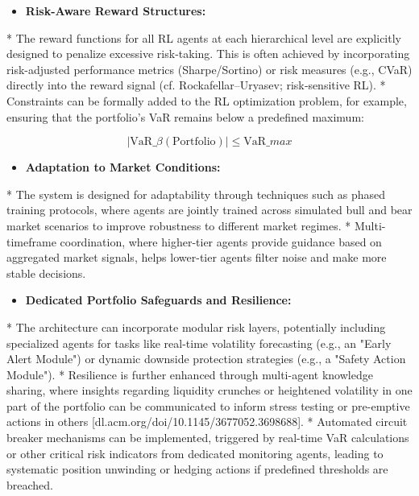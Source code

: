 \documentclass[11pt,a4paper]{article}
\begin{document}
\begin{itemize}
\item   \textbf{Risk-Aware Reward Structures:}
\end{itemize}
    *   The reward functions for all RL agents at each hierarchical level are explicitly designed to penalize excessive risk-taking. This is often achieved by incorporating risk-adjusted performance metrics (Sharpe/Sortino) or risk measures (e.g., CVaR) directly into the reward signal (cf. Rockafellar–Uryasev; risk‑sensitive RL).
    *   Constraints can be formally added to the RL optimization problem, for example, ensuring that the portfolio's VaR remains below a predefined maximum:
    
\begin{equation}
|\text{VaR}\_\beta(\text{Portfolio})| \leq \text{VaR}\_{max}
\end{equation}

\begin{itemize}
\item   \textbf{Adaptation to Market Conditions:}
\end{itemize}
    *   The system is designed for adaptability through techniques such as phased training protocols, where agents are jointly trained across simulated bull and bear market scenarios to improve robustness to different market regimes.
    *   Multi-timeframe coordination, where higher-tier agents provide guidance based on aggregated market signals, helps lower-tier agents filter noise and make more stable decisions.

\begin{itemize}
\item   \textbf{Dedicated Portfolio Safeguards and Resilience:}
\end{itemize}
    *   The architecture can incorporate modular risk layers, potentially including specialized agents for tasks like real-time volatility forecasting (e.g., an "Early Alert Module") or dynamic downside protection strategies (e.g., a "Safety Action Module").
    *   Resilience is further enhanced through multi-agent knowledge sharing, where insights regarding liquidity crunches or heightened volatility in one part of the portfolio can be communicated to inform stress testing or pre-emptive actions in others [dl.acm.org/doi/10.1145/3677052.3698688].
    *   Automated circuit breaker mechanisms can be implemented, triggered by real-time VaR calculations or other critical risk indicators from dedicated monitoring agents, leading to systematic position unwinding or hedging actions if predefined thresholds are breached.
\end{document}
